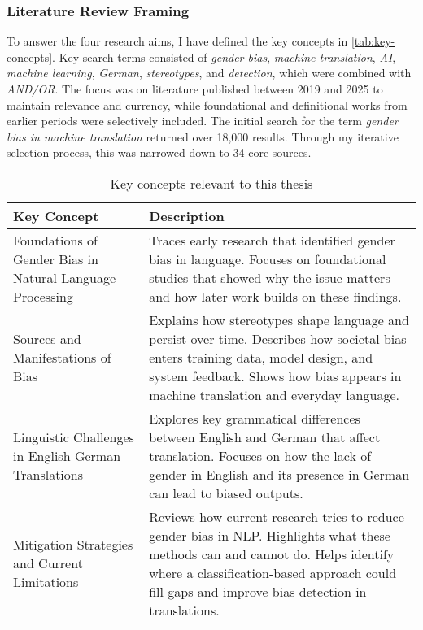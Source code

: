         \subsubsection{Literature Review Framing}
        To answer the four research aims, I have defined the key concepts in \autoref{tab:key-concepts}. Key search terms consisted of \textit{gender bias}, \textit{machine translation}, \textit{AI}, \textit{machine learning}, \textit{German}, \textit{stereotypes}, and \textit{detection}, which were combined with \textit{AND/OR}. The focus was on literature published between 2019 and 2025 to maintain relevance and currency, while foundational and definitional works from earlier periods were selectively included. The initial search for the term \textit{gender bias in machine translation} returned over 18,000 results. Through my iterative selection process, this was narrowed down to 34 core sources.

        \renewcommand{\arraystretch}{1.3}
            \begin{table}[ht!]
            \centering
            \begin{tabularx}{\textwidth}{>{\raggedright\arraybackslash}p{6.5cm}X}
            \toprule
            \textbf{Key Concept} & \textbf{Description} \\
            \midrule

            Foundations of Gender Bias in Natural Language Processing & Traces early research that identified gender bias in language. Focuses on foundational studies that showed why the issue matters and how later work builds on these findings. \\

            Sources and Manifestations of Bias & Explains how stereotypes shape language and persist over time. Describes how societal bias enters training data, model design, and system feedback. Shows how bias appears in machine translation and everyday language. \\

            Linguistic Challenges in English-German Translations & Explores key grammatical differences between English and German that affect translation. Focuses on how the lack of gender in English and its presence in German can lead to biased outputs. \\

            Mitigation Strategies and Current Limitations & Reviews how current research tries to reduce gender bias in NLP. Highlights what these methods can and cannot do. Helps identify where a classification-based approach could fill gaps and improve bias detection in translations. \\
            \bottomrule
            \end{tabularx}
            \caption{Key concepts relevant to this thesis}
            \label{tab:key-concepts}
        \end{table}


